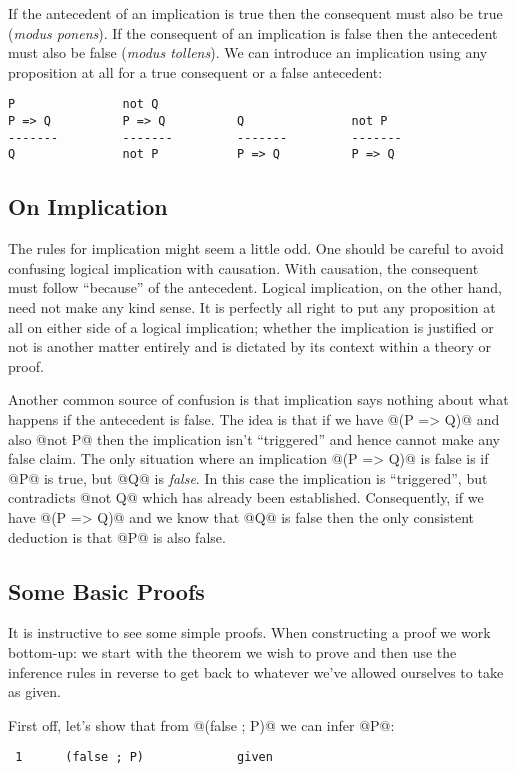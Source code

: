 \begin{itemize}
If the antecedent of an implication is true then the consequent must
also be true (\emph{modus ponens}).
If the consequent of an implication is false then the antecedent must
also be false (\emph{modus tollens}).
We can introduce an implication using any proposition at all for a true
consequent or a false antecedent:
\begin{verbatim}
P               not Q
P => Q          P => Q          Q               not P
-------         -------         -------         -------
Q               not P           P => Q          P => Q
\end{verbatim}

\subsection{On Implication}

The rules for implication might seem a little odd.  One should be
careful to avoid confusing logical implication with causation.  With
causation, the consequent must follow ``because'' of the antecedent.
Logical implication, on the other hand, need not make any kind sense.
It is perfectly all right to put any proposition at all on either side
of a logical implication; whether the implication is justified or not is
another matter entirely and is dictated by its context within a theory
or proof.

Another common source of confusion is that implication says nothing
about what happens if the antecedent is false.  The idea is that if we
have @(P => Q)@ and also @not P@ then the implication isn't
``triggered'' and hence cannot make any false claim.  The only situation
where an implication @(P => Q)@ is false is if @P@ is true, but @Q@ is
\emph{false}.  In this case the implication is ``triggered'', but
contradicts @not Q@ which has already been established.  Consequently,
if we have @(P => Q)@ and we know that @Q@ is false then the only
consistent deduction is that @P@ is also false.

\subsection{Some Basic Proofs}

It is instructive to see some simple proofs.  When constructing a proof
we work bottom-up: we start with the theorem we wish to prove and then
use the inference rules in reverse to get back to whatever we've allowed
ourselves to take as given.

First off, let's show that from @(false ; P)@ we can infer @P@:
\begin{verbatim}
 1      (false ; P)             given


\end{verbatim}
\end{itemize}
